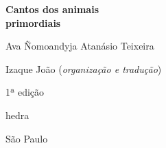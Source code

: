 




\begingroup\thispagestyle{empty}\vspace*{.05\textheight} 

              {\formular
              \huge
              \noindent
              \textbf{Cantos dos animais\\primordiais}\\
                
              \vspace{-0.5cm}
              
              }

              \vspace{1cm}
              
              {\formular\Large
              \noindent{}Ava Ñomoandyja Atanásio Teixeira
              }

              \vfill              

              {\small
              \noindent{}Izaque João (\textit{organização e tradução})
              }

              \vspace{0.5cm}

              {\small\noindent{}1ª edição}

              \vfill
              \newfontfamily{}
              {\noindent\fontsize{30}{40}\selectfont \timesnewroman hedra}

              {\selectfont\small\noindent São Paulo \quad\the\year}

\endgroup
\pagebreak
